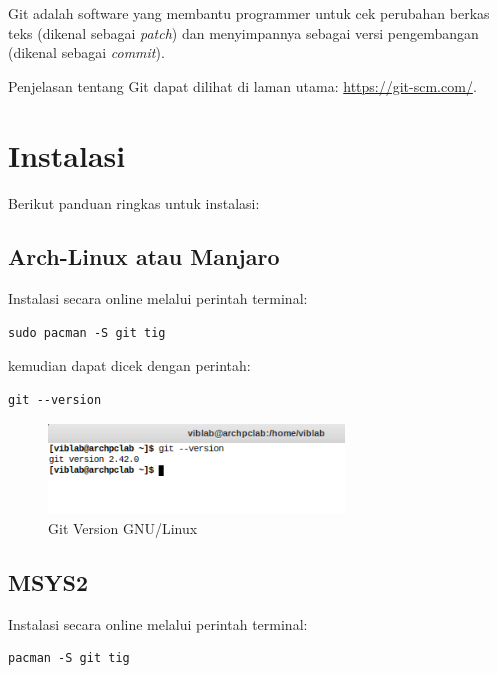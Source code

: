 \documentclass[12pt]{book}
\begin{document}
	Git adalah software yang membantu programmer untuk cek perubahan berkas teks (dikenal sebagai \textit{patch})
	dan menyimpannya sebagai versi pengembangan (dikenal sebagai \textit{commit}).
	
	Penjelasan tentang Git dapat dilihat di laman utama: \url{https://git-scm.com/}.
	
	\section{Instalasi}
	
	Berikut panduan ringkas untuk instalasi:
	
	\subsection{Arch-Linux atau Manjaro}
	
	Instalasi secara online melalui perintah terminal:

	\begin{verbatim}
sudo pacman -S git tig
	\end{verbatim}
	
	kemudian dapat dicek dengan perintah:
	
	\begin{verbatim}
git --version
	\end{verbatim}
	
	\begin{figure}[!ht]
		\centering
		\includegraphics[width=0.7\textwidth]{images/git/gitvergnu}
		\caption{Git Version GNU/Linux}
	\end{figure}
	
	\subsection{MSYS2}
	
	Instalasi secara online melalui perintah terminal:
	
	\begin{verbatim}
pacman -S git tig
	\end{verbatim}
	
\end{document}
